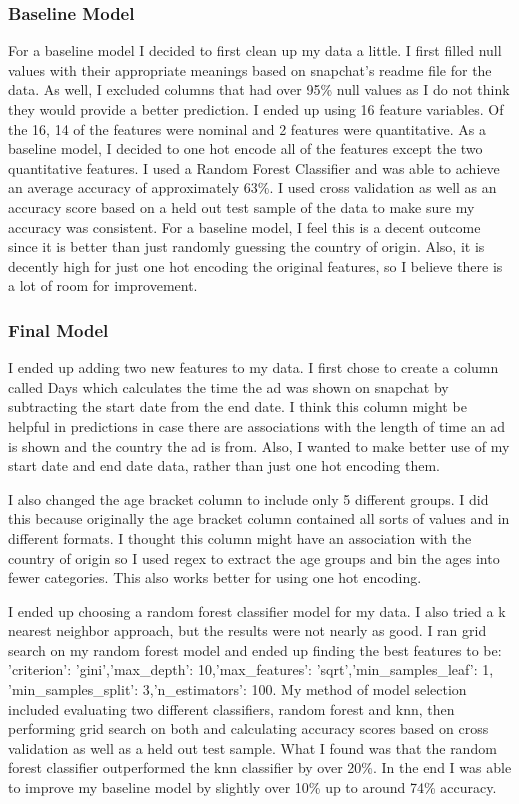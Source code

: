 \documentclass[11pt]{article}
\begin{document}
\subsubsection{Baseline Model}\label{baseline-model}

For a baseline model I decided to first clean up my data a little. I
first filled null values with their appropriate meanings based on
snapchat's readme file for the data. As well, I excluded columns that
had over 95\% null values as I do not think they would provide a better
prediction. I ended up using 16 feature variables. Of the 16, 14 of the
features were nominal and 2 features were quantitative. As a baseline
model, I decided to one hot encode all of the features except the two
quantitative features. I used a Random Forest Classifier and was able to
achieve an average accuracy of approximately 63\%. I used cross
validation as well as an accuracy score based on a held out test sample
of the data to make sure my accuracy was consistent. For a baseline
model, I feel this is a decent outcome since it is better than just
randomly guessing the country of origin. Also, it is decently high for
just one hot encoding the original features, so I believe there is a lot
of room for improvement.

\subsubsection{Final Model}\label{final-model}

I ended up adding two new features to my data. I first chose to create a
column called Days which calculates the time the ad was shown on
snapchat by subtracting the start date from the end date. I think this
column might be helpful in predictions in case there are associations
with the length of time an ad is shown and the country the ad is from.
Also, I wanted to make better use of my start date and end date data,
rather than just one hot encoding them.

I also changed the age bracket column to include only 5 different
groups. I did this because originally the age bracket column contained
all sorts of values and in different formats. I thought this column
might have an association with the country of origin so I used regex to
extract the age groups and bin the ages into fewer categories. This also
works better for using one hot encoding.

I ended up choosing a random forest classifier model for my data. I also
tried a k nearest neighbor approach, but the results were not nearly as
good. I ran grid search on my random forest model and ended up finding
the best features to be: 'criterion': 'gini','max\_depth':
10,'max\_features': 'sqrt','min\_samples\_leaf': 1,
'min\_samples\_split': 3,'n\_estimators': 100. My method of model
selection included evaluating two different classifiers, random forest
and knn, then performing grid search on both and calculating accuracy
scores based on cross validation as well as a held out test sample. What
I found was that the random forest classifier outperformed the knn
classifier by over 20\%. In the end I was able to improve my baseline
model by slightly over 10\% up to around 74\% accuracy.
\end{document}
